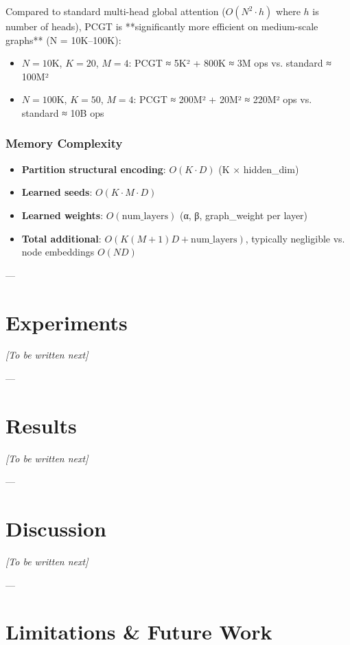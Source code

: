 \documentclass[11pt, a4paper]{article}
\begin{document}
Compared to standard multi-head global attention ($O(N^2 \cdot h)$ where $h$ is number of heads), PCGT is **significantly more efficient on medium-scale graphs** (N = 10K–100K):

\begin{itemize}
    \item $N = 10$K, $K = 20$, $M = 4$: PCGT ≈ 5K² + 800K ≈ 3M ops vs. standard ≈ 100M² 
    \item $N = 100$K, $K = 50$, $M = 4$: PCGT ≈ 200M² + 20M² ≈ 220M² ops vs. standard ≈ 10B ops
\end{itemize}

\subsubsection{Memory Complexity}

\begin{itemize}
    \item \textbf{Partition structural encoding}: $O(K \cdot D)$ (K × hidden\_dim)
    \item \textbf{Learned seeds}: $O(K \cdot M \cdot D)$
    \item \textbf{Learned weights}: $O(\text{num\_layers})$ (α, β, graph\_weight per layer)
    \item \textbf{Total additional}: $O(K(M + 1)D + \text{num\_layers})$, typically negligible vs. node embeddings $O(ND)$
\end{itemize}

---

\section{Experiments}

\emph{[To be written next]}

---

\section{Results}

\emph{[To be written next]}

---

\section{Discussion}

\emph{[To be written next]}

---

\section{Limitations \& Future Work}
\end{document}
